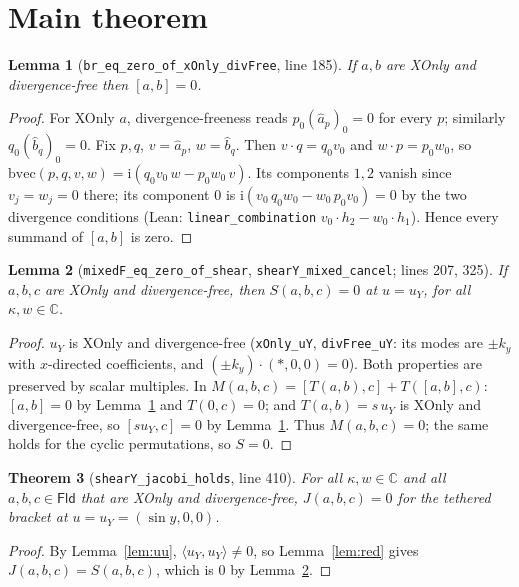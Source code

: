 \documentclass[11pt]{article}\emergencystretch=2em
\newtheorem{theorem}{Theorem}\newtheorem{lemma}[theorem]{Lemma}\newtheorem{proposition}[theorem]{Proposition}
\theoremstyle{definition}\newtheorem{definition}[theorem]{Definition}\theoremstyle{remark}\newtheorem{remark}[theorem]{Remark}
\newcommand{\Fld}{\mathsf{Fld}}\newcommand{\br}[2]{[#1,#2]}\newcommand{\pr}[2]{\langle #1,#2\rangle}
\newcommand{\ii}{\mathrm{i}}
\begin{document}
\section{Main theorem}
\begin{lemma}[\texttt{br\_eq\_zero\_of\_xOnly\_divFree}, line 185]\label{lem:ab}
If $a,b$ are XOnly and divergence-free then $\br ab=0$.
\end{lemma}
\begin{proof}
For XOnly $a$, divergence-freeness reads $p_0(\hat a_p)_0=0$ for every $p$; similarly $q_0(\hat b_q)_0=0$. Fix $p,q$, $v=\hat a_p$, $w=\hat b_q$. Then $v\cdot q=q_0v_0$ and $w\cdot p=p_0w_0$, so $\mathrm{bvec}(p,q,v,w)=\ii(q_0v_0\,w-p_0w_0\,v)$. Its components $1,2$ vanish since $v_j=w_j=0$ there; its component $0$ is $\ii(v_0\,q_0w_0-w_0\,p_0v_0)=0$ by the two divergence conditions (Lean: \texttt{linear\_combination} $v_0\cdot h_2-w_0\cdot h_1$). Hence every summand of $\br ab$ is zero.
\end{proof}
\begin{lemma}[\texttt{mixedF\_eq\_zero\_of\_shear}, \texttt{shearY\_mixed\_cancel}; lines 207, 325]\label{lem:mix}
If $a,b,c$ are XOnly and divergence-free, then $S(a,b,c)=0$ at $u=u_Y$, for all $\kappa,w\in\mathbb C$.
\end{lemma}
\begin{proof}
$u_Y$ is XOnly and divergence-free (\texttt{xOnly\_uY}, \texttt{divFree\_uY}: its modes are $\pm k_y$ with $x$-directed coefficients, and $(\pm k_y)\cdot(\ast,0,0)=0$). Both properties are preserved by scalar multiples. In $M(a,b,c)=\br{T(a,b)}{c}+T(\br ab,c)$: $\br ab=0$ by Lemma~\ref{lem:ab} and $T(0,c)=0$; and $T(a,b)=s\,u_Y$ is XOnly and divergence-free, so $\br{s u_Y}{c}=0$ by Lemma~\ref{lem:ab}. Thus $M(a,b,c)=0$; the same holds for the cyclic permutations, so $S=0$.
\end{proof}
\begin{theorem}[\texttt{shearY\_jacobi\_holds}, line 410]\label{thm:main}
For all $\kappa,w\in\mathbb C$ and all $a,b,c\in\Fld$ that are XOnly and divergence-free,
$J(a,b,c)=0$ for the tethered bracket at $u=u_Y=(\sin y,0,0)$.
\end{theorem}
\begin{proof}
By Lemma~\ref{lem:uu}, $\pr{u_Y}{u_Y}\ne0$, so Lemma~\ref{lem:red} gives $J(a,b,c)=S(a,b,c)$, which is $0$ by Lemma~\ref{lem:mix}.
\end{proof}
\end{document}
